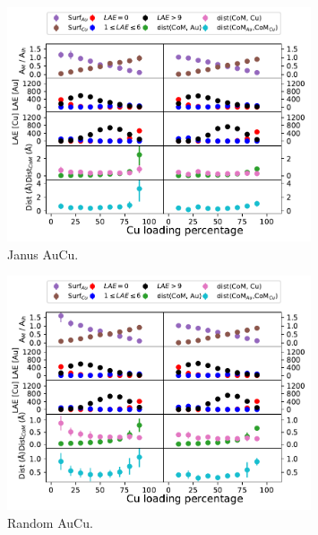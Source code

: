 \begin{figure}
    \centering
    \includegraphics[width=0.8\textwidth]{figures/MD/Alloys/Janus_Au-Cu.pdf}
    \caption{Janus AuCu.}
    \label{fig:AuCuJan_Dyn}
\end{figure}

\begin{figure}
    \centering
    \includegraphics[width=0.8\textwidth]{figures/MD/Alloys/Random_Au-Cu.pdf}
    \caption{Random AuCu.}
    \label{fig:AuCuRnd_Dyn}
\end{figure}


